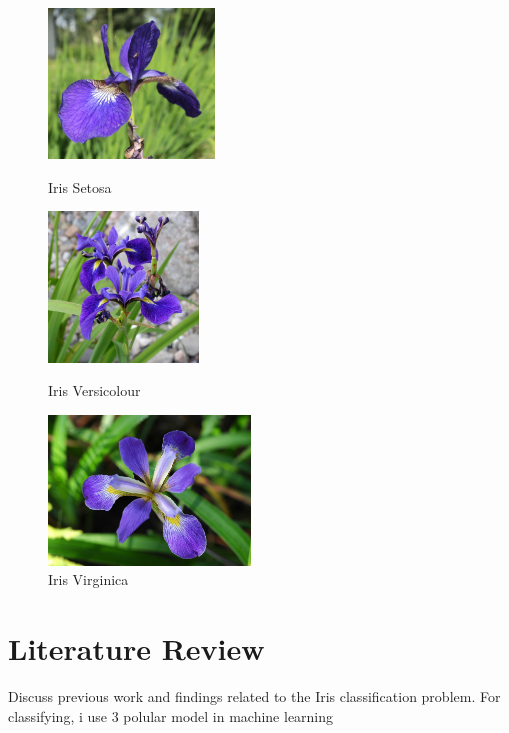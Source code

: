 \documentclass[a4paper]{article}
\begin{document}
\begin{figure}[h]
	\centering
	\begin{minipage}{0.32\textwidth}
		\centering
		\includegraphics[height=4cm]{picture/flower/Iris Setosa} %
		\caption{Iris Setosa}
		\label{fig:setosa}
	\end{minipage}\hfill
	\begin{minipage}{0.32\textwidth}
		\centering
		\includegraphics[height=4cm]{picture/flower/Iris Versicolour} %
		\caption{Iris Versicolour}
		\label{fig:versicolour}
	\end{minipage}\hfill
	\begin{minipage}{0.32\textwidth}
		\centering
		\includegraphics[height=4cm]{picture/flower/Iris Virginica} %
		\caption{Iris Virginica}
		\label{fig:virginica}
	\end{minipage}
\end{figure}

\section{Literature Review}
Discuss previous work and findings related to the Iris classification problem.
For classifying, i use 3 polular model in machine learning

\end{document}
